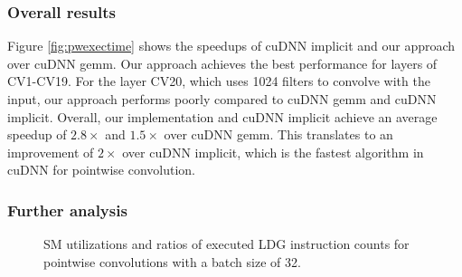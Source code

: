 \subsubsection{Overall results} Figure \ref{fig:pwexectime} shows the speedups of cuDNN implicit and our approach over cuDNN gemm.
Our approach achieves the best performance for layers of CV1-CV19.
For the layer CV20, which uses 1024 filters to convolve with the input, our approach performs poorly compared to cuDNN gemm and cuDNN implicit.
Overall, our implementation and cuDNN implicit achieve an average speedup of $2.8\times$ and $1.5\times$ over cuDNN gemm. 
This translates to an improvement of $2\times$ over cuDNN implicit, which is the fastest algorithm in cuDNN for pointwise convolution.

\subsubsection{Further analysis}
\begin{figure}
    \centering
    \qquad
    \vspace{5mm}
    \vspace{-4mm}
    \caption{SM utilizations and ratios of executed LDG instruction counts for pointwise convolutions with a batch size of 32.}
    \label{fig:pwinfo}
\end{figure}
